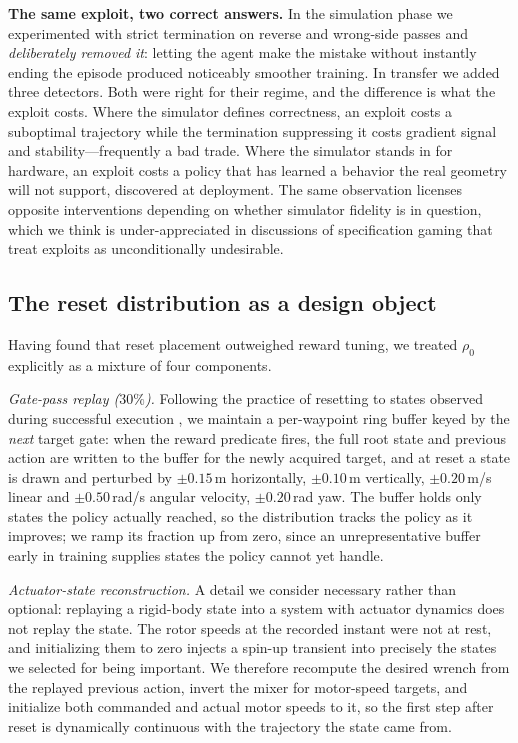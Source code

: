 \documentclass[10pt, twocolumn]{article}
\begin{document}
\textbf{The same exploit, two correct answers.} In the simulation phase we
experimented with strict termination on reverse and wrong-side passes and
\emph{deliberately removed it}: letting the agent make the mistake without
instantly ending the episode produced noticeably smoother training. In transfer
we added three detectors. Both were right for their regime, and the difference
is what the exploit costs. Where the simulator defines correctness, an exploit
costs a suboptimal trajectory while the termination suppressing it costs
gradient signal and stability---frequently a bad trade. Where the simulator
stands in for hardware, an exploit costs a policy that has learned a behavior
the real geometry will not support, discovered at deployment. The same
observation licenses opposite interventions depending on whether simulator
fidelity is in question, which we think is under-appreciated in discussions of
specification gaming \cite{amodei2016} that treat exploits as unconditionally
undesirable.

\subsection{The reset distribution as a design object}
\label{sec:reset}

Having found that reset placement outweighed reward tuning, we treated $\rho_0$
explicitly as a mixture of four components.

\emph{Gate-pass replay ($30\%$).} Following the practice of resetting to states
observed during successful execution \cite{kaufmann2023,song2023}, we maintain
a per-waypoint ring buffer keyed by the \emph{next} target gate: when the
reward predicate fires, the full root state and previous action are written to
the buffer for the newly acquired target, and at reset a state is drawn and
perturbed by $\pm0.15$\,m horizontally, $\pm0.10$\,m vertically,
$\pm0.20$\,m/s linear and $\pm0.50$\,rad/s angular velocity, $\pm0.20$\,rad
yaw. The buffer holds only states the policy actually reached, so the
distribution tracks the policy as it improves; we ramp its fraction up from
zero, since an unrepresentative buffer early in training supplies states the
policy cannot yet handle.

\emph{Actuator-state reconstruction.} A detail we consider necessary rather
than optional: replaying a rigid-body state into a system with actuator
dynamics does not replay the state. The rotor speeds at the recorded instant
were not at rest, and initializing them to zero injects a spin-up transient
into precisely the states we selected for being important. We therefore
recompute the desired wrench from the replayed previous action, invert the mixer
for motor-speed targets, and initialize both commanded and actual motor speeds
to it, so the first step after reset is dynamically continuous with the
trajectory the state came from.
\end{document}
